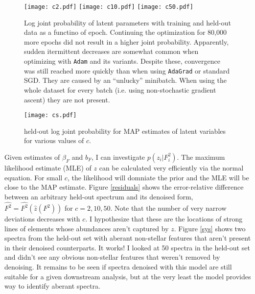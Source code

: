 \documentclass[12pt]{article}
\begin{document}
\begin{figure}
    \centering
    \texttt{[image: c2.pdf]}
    \texttt{[image: c10.pdf]}
    \texttt{[image: c50.pdf]}
    \caption{Log joint probability of latent parameters with training and held-out data as a functino of epoch. Continuing the optimization for 80,000 more epochs did not result in a higher joint probability. Apparently, sudden itermittent decreases are somewhat common when optimizing with \texttt{Adam} and its variants.  Despite these, convergence was still reached more quickly than when using \texttt{AdaGrad} or standard SGD. They are caused by an ``unlucky'' minibatch.  When using the whole dataset for every batch (i.e. using non-stochastic gradient ascent) they are not present.}
    \label{training}
\end{figure}

\begin{figure}
    \centering
    \texttt{[image: cs.pdf]}
    \caption{held-out log joint probability for MAP estimates of latent variables for various values of $c$.}
    \label{cs}
\end{figure}

Given estimates of $\beta_F$ and $b_F$, I can investigate $p(z_i | F^2_i)$.
The maximum likelihood estimate (MLE) of $z$ can be calculated very efficiently via the normal equation.
For small $c$, the likelihood will domniate the prior and the MLE will be close to the MAP estimate.
Figure \ref{residuals} shows the error-relative difference between an arbitrary held-out spectrum and its denoised form, $\widehat{F^2}  = \widehat{F^2}(\hat{z}(F^2))$ for $c=2, 10, 50$.
Note that the number of very narrow deviations decreases with $c$.
I hypothesize that these are the locations of strong lines of elements whose abundances aren't captured by $z$.
Figure \ref{sys} shows two spectra from the held-out set with aberant non-stellar features that aren't present in their denoised counterparts.  It works!
I looked at 50 spectra in the held-out set and didn't see any obvious non-stellar features that weren't removed by denoising.
It remains to be seen if spectra denoised with this model are still suitable for a given downstream analysis, but at the very least the model provides way to identify aberant spectra.
\end{document}
